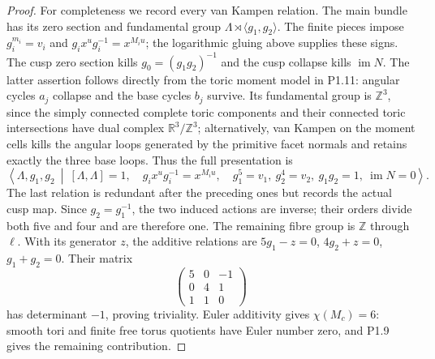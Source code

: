 \begin{proof}
For completeness we record every van Kampen relation.  The main
bundle has its zero section and fundamental group
$\Lambda\rtimes\langle g_1,g_2\rangle$.
The finite pieces impose
$g_i^{m_i}=v_i$ and $g_ix^ug_i^{-1}=x^{M_iu}$; the logarithmic gluing
above supplies these signs.  The cusp zero section kills
$g_0=(g_1g_2)^{-1}$ and the cusp collapse kills $\operatorname{im}N$.
The latter assertion follows directly from the toric moment model in
P1.11: angular cycles $a_j$ collapse and the base cycles $b_j$ survive.
Its fundamental group is $\mathbb Z^3$, since the simply connected
complete toric components and their connected toric intersections have
dual complex $\mathbb R^3/\mathbb Z^3$; alternatively, van Kampen on
the moment cells kills the angular loops generated by the primitive
facet normals and retains exactly the three base loops.
Thus the full presentation is
\[
\left\langle \Lambda,g_1,g_2\ \middle|\
 [\Lambda,\Lambda]=1,\quad
 g_ix^ug_i^{-1}=x^{M_iu},\quad
 g_1^5=v_1,\ g_2^4=v_2,\ g_1g_2=1,\ \operatorname{im}N=0
\right\rangle.
\]
The last relation is redundant after the preceding ones but records
the actual cusp map.  Since $g_2=g_1^{-1}$, the two induced actions are
inverse; their orders divide both five and four and are therefore one.
The remaining fibre group is $\mathbb Z$ through $\ell$.  With its
generator $z$, the additive relations are
$5g_1-z=0$, $4g_2+z=0$, $g_1+g_2=0$.
Their matrix
\[
\begin{pmatrix}5&0&-1\\0&4&1\\1&1&0\end{pmatrix}
\]
has determinant $-1$, proving triviality.
Euler additivity gives $\chi(M_c)=6$: smooth tori and finite free
torus quotients have Euler number zero, and P1.9 gives the remaining
contribution.
\end{proof}


